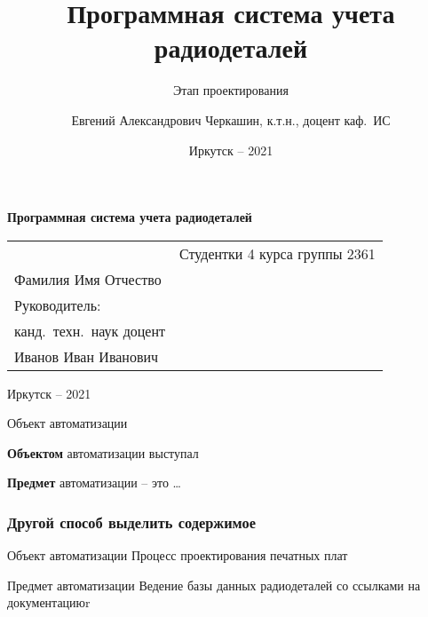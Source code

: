 \documentclass{beamer}
\begin{document}
\title[Учет радиодеталей]{Программная система учета радиодеталей}
\subtitle{Этап проектирования}
\author[Е.~А.~Черкашин]{Евгений Александрович Черкашин, к.т.н., доцент каф.~ИС}
\date{Иркутск -- 2021}

\frame{\titlepage}

\begin{frame}
  \vfill
  \begin{block}{}
    \fontsize{20}{25}\selectfont \bfseries\centering
    \alert{Программная система учета радиодеталей}
  \end{block}
\vspace{3em}
\noindent\begin{tabularx}{\textwidth} {
  >{\raggedright\arraybackslash}X
  >{\raggedright}X }
&
Студентки 4 курса группы 2361\\
Фамилия Имя Отчество\\[0.3em]
Руководитель:\\
канд.~техн.~наук доцент\\
Иванов Иван Иванович
\end{tabularx}
\vfill
\begin{center}
  Иркутск -- 2021
\end{center}%
\end{frame}

\begin{frame}[fragile]{Объект автоматизации}

  \textbf{Объектом} автоматизации выступал

  \textbf{Предмет} автоматизации -- это \ldots

\end{frame}

\begin{frame}
  \frametitle{Другой способ выделить содержимое}

  \begin{block}{Объект автоматизации}
    Процесс проектирования печатных плат
  \end{block}

  \begin{alertblock}{Предмет автоматизации}
    Ведение базы данных радиодеталей со ссылками на документациюr
  \end{alertblock}
\end{frame}
\end{document}

